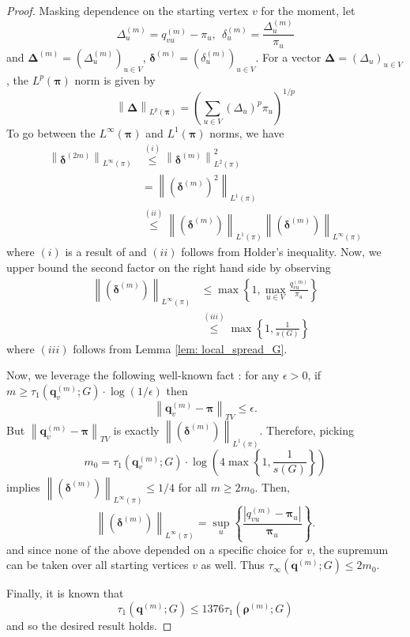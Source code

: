 \documentclass{article}
\newcommand{\abs}[1]{\left \lvert #1 \right \rvert}
\newcommand{\norm}[1]{\left\lVert#1\right\rVert}
\newcommand{\1}{\mathbf{1}}
\newcommand{\qbf}{\mathbf{q}}
\newcommand{\pibf}{\bm{\pi}}
\newcommand{\rhobf}{\bm{\rho}}
\newcommand{\Deltabf}{\bm{\Delta}}
\newcommand{\deltabf}{\bm{\delta}}
\theoremstyle{aldenthm}
\begin{document}
\begin{proof}
	Masking dependence on the starting vertex $v$ for the moment, let
	\begin{equation*}
	\Delta_u^{(m)} = q_{vu}^{(m)} - \pi_u, ~~ \delta_u^{(m)} = \frac{\Delta_u^{(m)}}{\pi_u}
	\end{equation*}
	and $\Deltabf^{(m)} = (\Delta_u^{(m)})_{u \in V}$, $\deltabf^{(m)} = (\delta_u^{(m)})_{u \in V}$. For a vector $\Deltabf = (\Delta_u)_{u \in V}$, the $L^{p}(\pibf)$ norm is given by
	\begin{equation*}
	\norm{\Deltabf}_{L^p(\pibf)} = \left(\sum_{u \in V} \left(\Delta_u\right)^{p} \pi_u \right)^{1/p}
	\end{equation*}
	To go between the $L^{\infty}(\pibf)$ and $L^{1}(\pibf)$ norms, we have
	\begin{align*}
	\norm{\deltabf^{(2m)}}_{L^{\infty}(\pi)} & \overset{(i)}{\leq} \norm{\deltabf^{(m)}}^2_{L^{2}(\pi)} \\
	& = \norm{(\deltabf^{(m)})^2}_{L^{1}(\pi)} \\
	& \overset{(ii)}{\leq}  \norm{(\deltabf^{(m)})}_{L^{1}(\pi)} \norm{(\deltabf^{(m)})}_{L^{\infty}(\pi)}
	\end{align*}
	where $(i)$ is a result of \cite{benjamini2003} and $(ii)$ follows from Holder's inequality. Now, we upper bound the second factor on the right hand side by observing
	\begin{align*}
	\norm{(\deltabf^{(m)})}_{L^{\infty}(\pi)} & \leq \max\left\{1, \max_{u \in V} \frac{q_{vu}^{(m)}}{\pi_u} \right\} \\
	& \overset{(iii)}{\leq} \max\left\{1, \frac{1}{s(G)}\right\}
	\end{align*}
	where $(iii)$ follows from Lemma \ref{lem: local_spread_G}.
	
	Now, we leverage the following well-known fact \cite{montenegro2002}: for any $\epsilon > 0$, if $m \geq \tau_1(\qbf_v^{(m)}; G) \cdot \log(1/\epsilon)$ then
	\begin{equation*}
	\norm{\qbf_v^{(m)} - \pibf}_{TV} \leq \epsilon.
	\end{equation*}
	But $\norm{\qbf_v^{(m)} - \pibf}_{TV}$ is exactly $\norm{(\deltabf^{(m)})}_{L^{1}(\pi)}$. Therefore, picking 
	\begin{equation*}
	m_0 = \tau_1(\qbf_v^{(m)}; G) \cdot \log \left(4 \max\left\{1, \frac{1}{s(G)}\right\} \right)
	\end{equation*} implies $\norm{(\deltabf^{(m)})}_{L^{\infty}(\pi)} \leq 1/4$ for all $m \geq 2 m_0$.  Then, 
	\begin{equation*}
	\norm{(\deltabf^{(m)})}_{L^{\infty}(\pi)} = \sup_{u}\left\{ \frac{\abs{q_{vu}^{(m)} - \pibf_u}}{\pibf_u} \right\}.
	\end{equation*}
	and since none of the above depended on a specific choice for $v$, the supremum can be taken over all starting vertices $v$ as well. Thus $\tau_{\infty}(\qbf^{(m)}; G) \leq 2m_0$. 
	
	Finally, it is known \cite{montenegro2002} that
	\begin{equation*}
	\tau_{1}(\qbf^{(m)}; G) \leq 1376 \tau_{1}(\rhobf^{(m)}; G)
	\end{equation*}
	and so the desired result holds.	
\end{proof}
\end{document}
